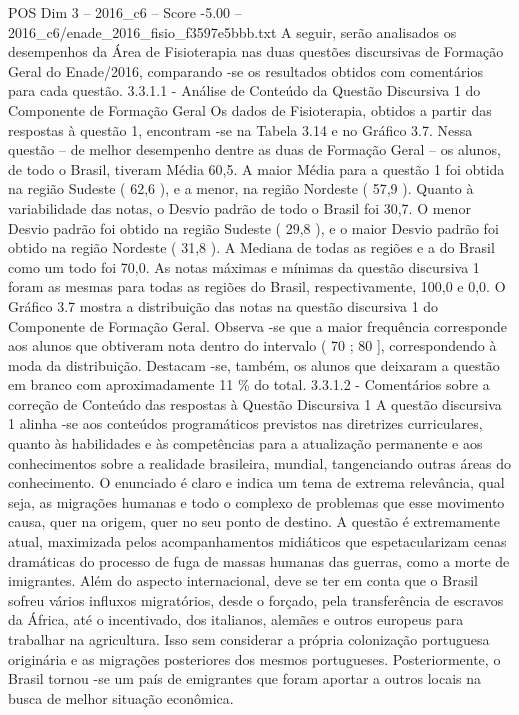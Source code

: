 \begin{textsample}{POS Dim 3 – 2016\_c6 – Score -5.00 – 2016\_c6/enade\_2016\_fisio\_f3597e5bbb.txt}
A seguir, serão analisados os desempenhos da Área de Fisioterapia nas duas questões discursivas de Formação Geral do Enade/2016, comparando -se os resultados obtidos com comentários para cada questão. 3.3.1.1 - Análise de Conteúdo da Questão Discursiva 1 do Componente de Formação Geral Os dados de Fisioterapia, obtidos a partir das respostas à questão 1, encontram -se na Tabela 3.14 e no Gráfico 3.7.
Nessa questão – de melhor desempenho dentre as duas de Formação Geral – os alunos, de todo o Brasil, tiveram Média 60,5.
A maior Média para a questão 1 foi obtida na região Sudeste ( 62,6 ), e a menor, na região Nordeste ( 57,9 ).
Quanto à variabilidade das notas, o Desvio padrão de todo o Brasil foi 30,7.
O menor Desvio padrão foi obtido na região Sudeste ( 29,8 ), e o maior Desvio padrão foi obtido na região Nordeste ( 31,8 ).
A Mediana de todas as regiões e a do Brasil como um todo foi 70,0.
As notas máximas e mínimas da questão discursiva 1 foram as mesmas para todas as regiões do Brasil, respectivamente, 100,0 e 0,0.
O Gráfico 3.7 mostra a distribuição das notas na questão discursiva 1 do Componente de Formação Geral.
Observa -se que a maior frequência corresponde aos alunos que obtiveram nota dentro do intervalo ( 70 ; 80 ], correspondendo à moda da distribuição.
Destacam -se, também, os alunos que deixaram a questão em branco com aproximadamente 11 \% do total. 3.3.1.2 - Comentários sobre a correção de Conteúdo das respostas à Questão Discursiva 1 A questão discursiva 1 alinha -se aos conteúdos programáticos previstos nas diretrizes curriculares, quanto às habilidades e às competências para a atualização permanente e aos conhecimentos sobre a realidade brasileira, mundial, tangenciando outras áreas do conhecimento.
O enunciado é claro e indica um tema de extrema relevância, qual seja, as migrações humanas e todo o complexo de problemas que esse movimento causa, quer na origem, quer no seu ponto de destino.
A questão é extremamente atual, maximizada pelos acompanhamentos midiáticos que espetacularizam cenas dramáticas do processo de fuga de massas humanas das guerras, como a morte de imigrantes.
Além do aspecto internacional, deve se ter em conta que o Brasil sofreu vários influxos migratórios, desde o forçado, pela transferência de escravos da África, até o incentivado, dos italianos, alemães e outros europeus para trabalhar na agricultura.
Isso sem considerar a própria colonização portuguesa originária e as migrações posteriores dos mesmos portugueses.
Posteriormente, o Brasil tornou -se um país de emigrantes que foram aportar a outros locais na busca de melhor situação econômica.

\end{textsample}
